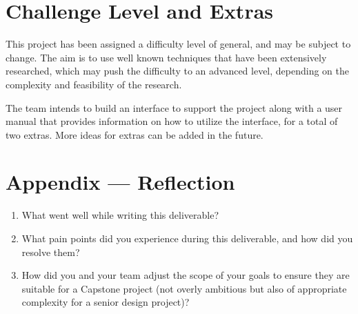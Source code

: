 \documentclass{article}
\begin{document}
\section{Challenge Level and Extras}
This project has been assigned a difficulty level of general, and may be subject
to change. The aim is to use well known techniques that have been extensively
researched, which may push the difficulty to an advanced level, depending on the
complexity and feasibility of the research. 


The team intends to build an interface to support the project along with a user
manual that provides information on how to utilize the interface, for a total of
two extras. More ideas for extras can be added in the future.



\newpage{}

\section*{Appendix --- Reflection}




\begin{enumerate}
    \item What went well while writing this deliverable? 
    \item What pain points did you experience during this deliverable, and how
    did you resolve them?
    \item How did you and your team adjust the scope of your goals to ensure
    they are suitable for a Capstone project (not overly ambitious but also of
    appropriate complexity for a senior design project)?
\end{enumerate}  
\end{document}

